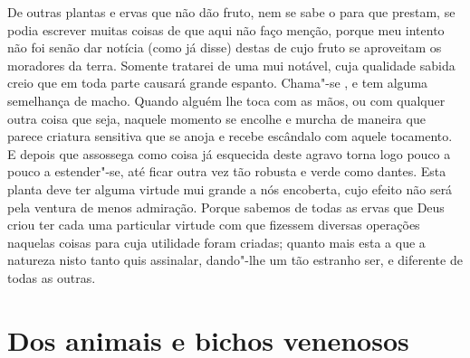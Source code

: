 De outras plantas e ervas que não dão fruto, nem se sabe o para que
prestam, se podia escrever muitas coisas de que aqui não faço menção,
porque meu intento não foi senão dar notícia (como já disse) destas de
cujo fruto se aproveitam os moradores da terra. Somente tratarei de uma
mui notável, cuja qualidade sabida creio que em toda parte causará
grande espanto. Chama"-se , e tem alguma semelhança de 
macho. Quando alguém lhe toca com as mãos, ou com qualquer outra coisa
que seja, naquele momento se encolhe e murcha de maneira que parece
criatura sensitiva que se anoja e recebe escândalo com aquele
tocamento. E depois que assossega como coisa já esquecida deste agravo
torna logo pouco a pouco a estender"-se, até ficar outra vez tão robusta
e verde como dantes. Esta planta deve ter alguma virtude mui grande a
nós encoberta, cujo efeito não será pela ventura de menos admiração.	%
Porque sabemos de todas as ervas que Deus criou ter cada uma particular
virtude com que fizessem diversas operações naquelas coisas para cuja	
utilidade foram criadas; quanto mais esta a que a natureza nisto tanto quis
assinalar, dando"-lhe um tão estranho ser, e diferente de todas as
outras.



\chapter[Dos animais e bichos venenosos]{Dos animais e bichos
venenosos}



